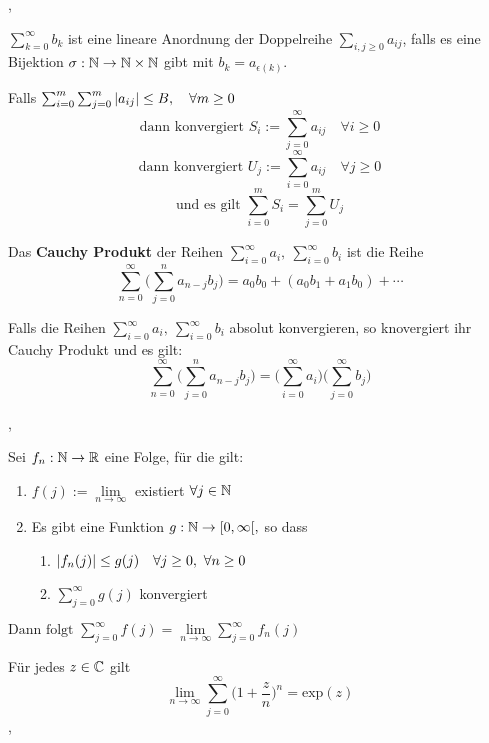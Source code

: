 \sep

\Def[2.7.22] $\sum_{k=0}^{\infty} b_{k}$ ist eine lineare Anordnung der Doppelreihe $\sum_{i,j \geq 0} a_{ij}$, falls es eine Bijektion $\sigma : \mathbb{N} \rightarrow \mathbb{N} \times \mathbb{N}$ gibt mit $b_k = a_{\epsilon(k)}$.

\Satz[2.7.23] Falls $\sum_{i=0}^{m}\sum_{j=0}^{m}\left\lvert a_{ij} \right\rvert \leq B, \quad \forall m \geq 0$
\[ \text{dann konvergiert } S_{i} := \sum_{j=0}^{\infty} a_{ij} \quad \forall i \geq 0 \]
\[ \text{dann konvergiert } U_{j} := \sum_{i=0}^{\infty} a_{ij} \quad \forall j \geq 0 \]
\[ \text{und es gilt } \sum_{i=0}^{m} S_{i} = \sum_{j=0}^{m} U_{j} \]

\Satz[2.7.24] Das \textbf{Cauchy Produkt} der Reihen $\sum_{i=0}^{\infty} a_i, \ \sum_{i=0}^{\infty} b_i$ ist die Reihe
\[\sum_{n=0}^\infty \Bigg(\sum_{j=0}^{n} a_{n-j} b_{j} \Bigg) = a_0 b_0 + (a_0 b_1 + a_1 b_0) + \cdots  \]

\Satz[2.7.26] Falls die Reihen $\sum_{i=0}^{\infty} a_i, \ \sum_{i=0}^{\infty} b_i$ absolut konvergieren, so knovergiert ihr Cauchy Produkt und es gilt:
\[\sum_{n=0}^\infty \Bigg(\sum_{j=0}^{n} a_{n-j} b_{j} \Bigg) = \Bigg( \sum_{i=0}^\infty a_i \Bigg) \Bigg(\sum_{j=0}^\infty b_j \Bigg) \]

\sep

\Satz[2.7.28] Sei $f_n : \mathbb{N} \rightarrow \mathbb{R}$ eine Folge, für die gilt:
\begin{enumerate}
\item[(1)] $ f(j) :=  \lim\limits_{n \rightarrow \infty}$ existiert $\forall j \in \mathbb{N}$ 
\item[(2)] Es gibt eine Funktion $g : \mathbb{N} \rightarrow [0, \infty[,$ so dass
\begin{enumerate}
\item[(2.1)] $\left\lvert f_n(j) \right\rvert \leq g(j) \quad \forall j \geq 0, \ \forall n \geq 0$
\item[(2.2)] $\sum_{j=0}^{\infty} g(j)$ konvergiert
\end{enumerate}
\end{enumerate}

\( \text{Dann folgt } \sum_{j=0}^{\infty} f(j) =  \lim\limits_{n \rightarrow \infty} \sum_{j=0}^{\infty} f_n(j) \)

\Korollar[2.7.29] Für jedes $z \in \mathbb{C}$ gilt
\[\lim\limits_{n \rightarrow \infty} \sum_{j=0}^{\infty} \bigg(1 + \frac{z}{n} \bigg)^n = \text{exp}(z) \]
\sep